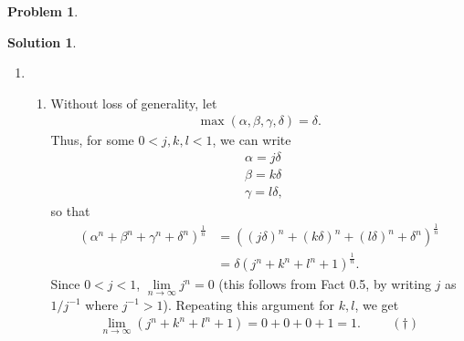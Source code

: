 \documentclass{article}
\theoremstyle{definition}
\newtheorem*{prob*}{Problem}
\newtheorem*{sln*}{Solution}
\begin{document}
\begin{prob*}
	\begin{sln*}
		$\,$\\
		\begin{enumerate}
			\item
			\begin{enumerate}
				\item Without loss of generality, let 
				\begin{align*}
				\max(\alpha, \beta, \gamma, \delta) = \delta.
				\end{align*}
				Thus, for some $0 < j,k,l < 1$, we can write
				\begin{align*}
				&\alpha = j\delta\\
				&\beta = k\delta\\
				&\gamma = l\delta,
				\end{align*}
				so that
				\begin{align*}
				 (\alpha^n + \beta^n + \gamma^n + \delta^n)^{\frac{1}{n}} &= \left( (j\delta)^n + (k\delta)^n + (l\delta)^n + \delta^n  \right)^{\frac{1}{n}}\\ &= \delta \left(j^n + k^n + l^n + 1\right)^{\frac{1}{n}}.
				\end{align*}
				Since $0 < j < 1$, $\lim\limits_{n\to\infty}j^n = 0$ (this follows from Fact 0.5, by writing $j$ as $1/j^{-1}$ where $j^{-1} > 1$). Repeating this argument for $k,l$, we get
				\begin{align*}
				\lim\limits_{n\to\infty} (j^n + k^n + l^n + 1) = 0 +0 +0 +1 = 1. \hspace{1cm} (\dagger)
				\end{align*}
				

\end{enumerate}
\end{enumerate}
\end{sln*}
\end{prob*}
\end{document}
